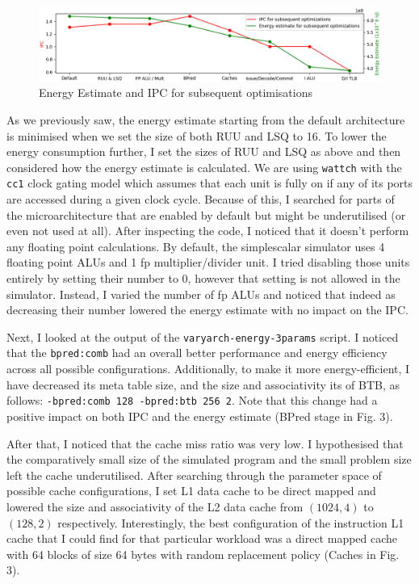 \documentclass[11pt]{article}
\begin{document}
\vspace{-1em}
\begin{figure}[H]
  \centering
    \includegraphics[width=1.0\textwidth]{"../plots/ipc-after-optimisations.png"}
    \caption{Energy Estimate and IPC for subsequent optimisations}
    \label{fig:final}
\end{figure}
\vspace{-1em}
As we previously saw, the energy estimate starting from the default
architecture is minimised when we set the size of both RUU and LSQ to 16. To
lower the energy consumption further, I set the sizes of RUU and LSQ as above
and then considered how the energy estimate is calculated. We are using
\texttt{wattch} with the \texttt{cc1} clock gating model which assumes that
each unit is fully on if any of its ports are accessed during a given clock
cycle. Because of this, I searched for parts of the microarchitecture that are
enabled by default but might be underutilised (or even not used at all). After
inspecting the code, I noticed that it doesn't perform any floating point
calculations. By default, the simplescalar simulator uses 4 floating point ALUs
and 1 fp multiplier/divider unit. I tried disabling those units entirely by
setting their number to 0, however that setting is not allowed in the
simulator. Instead, I varied the number of fp ALUs and noticed that indeed as
decreasing their number lowered the energy estimate with no impact on the IPC.

Next, I looked at the output of the \texttt{varyarch-energy-3params} script. I
noticed that the \texttt{bpred:comb} had an overall better performance and
energy efficiency across all possible configurations. Additionally, to make it
more energy-efficient, I have decreased its meta table size, and the size and
associativity its of BTB, as follows: \texttt{-bpred:comb 128 -bpred:btb 256
2}. Note that this change had a positive impact on both IPC and the energy
estimate (BPred stage in Fig. 3).


After that, I noticed that the cache miss ratio was very low. I hypothesised
that the comparatively small size of the simulated program and the small
problem size left the cache underutilised. After searching through the
parameter space of possible cache configurations, I set L1 data cache to be
direct mapped and lowered the size and associativity of the L2 data cache from
$(1024,4)$ to $(128,2)$ respectively. Interestingly, the best configuration of
the instruction L1 cache that I could find for that particular workload was a
direct mapped cache with 64 blocks of size 64 bytes with random replacement
policy (Caches in Fig. 3).
\end{document}
